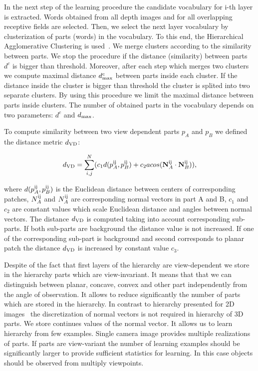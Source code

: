 \documentclass[letterpaper,10pt,conference]{ieeeconf}  %
\begin{document}
In the next step of the learning procedure the candidate vocabulary for i-th layer is extracted. Words obtained from all depth images and for all overlapping receptive fields are selected. Then, we select the next layer vocabulary by clusterization of parts (words) in the vocabulary. To this end, the Hierarchical Agglomerative Clustering is used~\cite{Manning2008}. We merge clusters according to the similarity between parts. We stop the procedure if the distance (similarity) between parts $d^c$ is bigger than threshold. Moreover, after each step which merges two clusters we compute maximal distance $d^c_{\rm max}$ between parts inside each cluster. If the distance inside the cluster is bigger than threshold the cluster is splited into two separate clusters. By using this procedure we limit the maximal distance between parts inside clusters. The number of obtained parts in the vocabulary depends on two parameters: $d^c$ and $d_{\rm max}$.

To compute similarity between two view dependent parts $p_A$ and $p_B$ we defined the distance metric $d_{\rm VD}$:

\begin{equation}
\label{distVD}
 d_{\rm VD}=\sum_{i,j}^N ( c_1 d(p_A^{\rm ij}, p_B^{\rm ij}) + c_2 acos({\bf N}_A^{\rm ij} \cdot {\bf N}_B^{\rm ij})),
\end{equation}

where $d(p_A^{\rm ij}, p_B^{\rm ij})$ is the Euclidean distance between centers of corresponding patches, $N_A^{\rm ij}$ and $N_A^{\rm ij}$ are corresponding normal vectors in part A and B, $c_1$ and $c_2$ are constant values which scale Euclidean distance and angles between normal vectors. The distance $d_{\rm VD}$ is computed taking into account corresponding sub-parts. If both sub-parts are background the distance value is not increased. If one of the corresponding sub-part is background and second corresponds to planar patch the distance $d_{\rm VD}$ is increased by constant value $c_3$.

Despite of the fact that first layers of the hierarchy are view-dependent we store in the hierarchy parts which are view-invariant. It means that that we can distinguish between planar, concave, convex and other part independently from the angle of observation. It allows to reduce significantly the number of parts which are stored in the hierarchy. In contrast to hierarchy presented for 2D images~\cite{Fiedler2014} the discretization of normal vectors is not required in hierarchy of 3D parts. We store continues values of the normal vector. It allows us to learn hierarchy from few examples. Single camera image provides multiple realizations of parts. If parts are view-variant the number of learning examples should be significantly larger to provide sufficient statistics for learning. In this case objects should be observed from multiply viewpoints.
\end{document}

